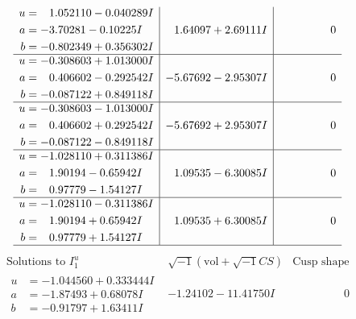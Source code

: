 \documentclass[1p]{elsarticle_modified}
\theoremstyle{definition}
\newcommand{\I}{\sqrt{-1}}
\begin{document}
$$\begin{array}{c|c|c}
\begin{aligned}
u &= \phantom{-}1.052110 - 0.040289 I \\
a &= -3.70281 - 0.10225 I \\
b &= -0.802349 + 0.356302 I\end{aligned}
 & \phantom{-}1.64097 + 2.69111 I & \phantom{-0.000000 } 0 \\ \hline\begin{aligned}
u &= -0.308603 + 1.013000 I \\
a &= \phantom{-}0.406602 - 0.292542 I \\
b &= -0.087122 + 0.849118 I\end{aligned}
 & -5.67692 - 2.95307 I & \phantom{-0.000000 } 0 \\ \hline\begin{aligned}
u &= -0.308603 - 1.013000 I \\
a &= \phantom{-}0.406602 + 0.292542 I \\
b &= -0.087122 - 0.849118 I\end{aligned}
 & -5.67692 + 2.95307 I & \phantom{-0.000000 } 0 \\ \hline\begin{aligned}
u &= -1.028110 + 0.311386 I \\
a &= \phantom{-}1.90194 - 0.65942 I \\
b &= \phantom{-}0.97779 - 1.54127 I\end{aligned}
 & \phantom{-}1.09535 - 6.30085 I & \phantom{-0.000000 } 0 \\ \hline\begin{aligned}
u &= -1.028110 - 0.311386 I \\
a &= \phantom{-}1.90194 + 0.65942 I \\
b &= \phantom{-}0.97779 + 1.54127 I\end{aligned}
 & \phantom{-}1.09535 + 6.30085 I & \phantom{-0.000000 } 0\\
 \hline 
 \end{array}$$\newpage$$\begin{array}{c|c|c}  
\text{Solutions to }I^u_{1}& \I (\text{vol} + \sqrt{-1}CS) & \text{Cusp shape}\\
 \hline 
\begin{aligned}
u &= -1.044560 + 0.333444 I \\
a &= -1.87493 + 0.68078 I \\
b &= -0.91797 + 1.63411 I\end{aligned}
 & -1.24102 - 11.41750 I & \phantom{-0.000000 } 0 \\ \hline\begin{aligned}

\end{aligned}
\end{array}$$
\end{document}
